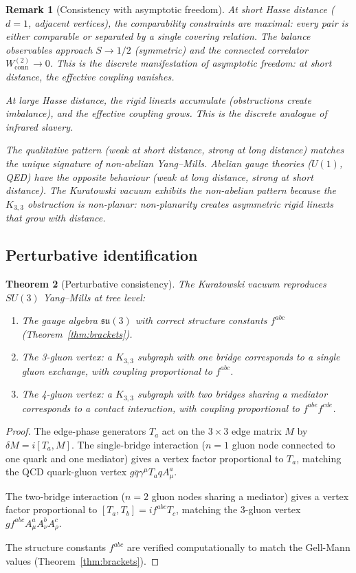 \documentclass[11pt]{article}
\newtheorem{theorem}{Theorem}[section]
\newtheorem{remark}[theorem]{Remark}
\newcommand{\Kthree}{K_{3,3}}
\begin{document}
\begin{remark}[Consistency with asymptotic freedom]
At short Hasse distance ($d = 1$, adjacent vertices), the
comparability constraints are maximal: every pair is either
comparable or separated by a single covering relation.
The balance observables approach $S \to 1/2$ (symmetric) and
the connected correlator $W^{(2)}_{\mathrm{conn}} \to 0$.
This is the discrete manifestation of asymptotic freedom:
at short distance, the effective coupling vanishes.

At large Hasse distance, the rigid linexts accumulate
(obstructions create imbalance), and the effective coupling
grows.  This is the discrete analogue of infrared slavery.

The qualitative pattern (weak at short distance, strong at
long distance) matches the unique signature of non-abelian
Yang--Mills.  Abelian gauge theories ($U(1)$, QED) have the
opposite behaviour (weak at long distance, strong at short
distance).  The Kuratowski vacuum exhibits the non-abelian
pattern because the $\Kthree$ obstruction is non-planar:
non-planarity creates asymmetric rigid linexts that grow
with distance.
\end{remark}

\subsection{Perturbative identification}
\label{sec:perturbative}

\begin{theorem}[Perturbative consistency]
\label{thm:perturbative}
The Kuratowski vacuum reproduces $SU(3)$ Yang--Mills at
tree level:
\begin{enumerate}
\item The gauge algebra $\mathfrak{su}(3)$ with correct
  structure constants $f^{abc}$
  (Theorem~\ref{thm:brackets}).
\item The 3-gluon vertex: a $\Kthree$ subgraph with one
  bridge corresponds to a single gluon exchange, with
  coupling proportional to $f^{abc}$.
\item The 4-gluon vertex: a $\Kthree$ subgraph with two
  bridges sharing a mediator corresponds to a contact
  interaction, with coupling proportional to
  $f^{abe} f^{cde}$.
\end{enumerate}
\end{theorem}

\begin{proof}
The edge-phase generators $T_a$ act on the $3 \times 3$
edge matrix $M$ by $\delta M = i [T_a, M]$.  The
single-bridge interaction ($n = 1$ gluon node connected to
one quark and one mediator) gives a vertex factor
proportional to $T_a$, matching the QCD quark-gluon vertex
$g \bar{q} \gamma^\mu T_a q A_\mu^a$.

The two-bridge interaction ($n = 2$ gluon nodes sharing a
mediator) gives a vertex factor proportional to
$[T_a, T_b] = i f^{abc} T_c$, matching the 3-gluon vertex
$g f^{abc} A_\mu^a A_\nu^b A_\rho^c$.

The structure constants $f^{abc}$ are verified
computationally to match the Gell-Mann values
(Theorem~\ref{thm:brackets}).
\end{proof}
\end{document}
